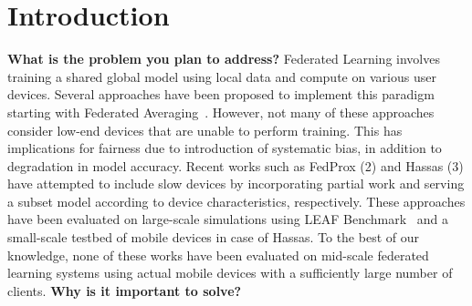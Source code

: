 \section{Introduction}
    \textbf{What is the problem you plan to address?}
    \newline
    \newline
    Federated Learning involves training a shared global model using local data and compute on various user devices.
    Several approaches have been proposed to implement this paradigm starting with Federated Averaging~\cite{DBLP:journals/corr/McMahanMRA16}.
    However, not many of these approaches consider low-end devices that are unable to perform training. 
    This has implications for fairness due to introduction of systematic bias, in addition to degradation in model accuracy.
    Recent works such as FedProx (2) and Hassas (3) have attempted to include slow devices by incorporating partial work and serving a subset model according to device characteristics, respectively. 
    These approaches have been evaluated on large-scale simulations using LEAF Benchmark~\cite{DBLP:journals/corr/abs-1812-01097} and a small-scale testbed of mobile devices in case of Hassas.
    To the best of our knowledge, none of these works have been evaluated on mid-scale federated learning systems using actual mobile devices with a sufficiently large number of clients.
    \newline
    \newline
    \textbf{Why is it important to solve?}